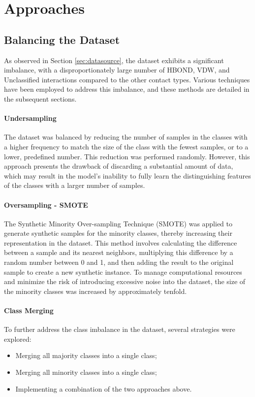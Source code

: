 \documentclass[10pt,twocolumn,letterpaper]{article}
\begin{document}
\section{Approaches}
\subsection{Balancing the Dataset}
As observed in Section \ref{sec:datasource}, the dataset exhibits a significant imbalance, with a disproportionately large number of HBOND, VDW, and Unclassified interactions compared to the other contact types. 
Various techniques have been employed to address this imbalance, and these methods are detailed in the subsequent sections.
\paragraph{Undersampling}
The dataset was balanced by reducing the number of samples in the classes with a higher frequency to match the size of the class with the fewest samples, or to a lower, predefined number. 
This reduction was performed randomly. However, this approach presents the drawback of discarding a substantial amount of data, which may result in the model's inability to fully learn the distinguishing features of the classes with a larger number of samples.

\paragraph{Oversampling - SMOTE}
The Synthetic Minority Over-sampling Technique (SMOTE)\cite{chawla2002smote} was applied to generate synthetic samples for the minority classes, thereby increasing their representation in the dataset. 
This method involves calculating the difference between a sample and its nearest neighbors, multiplying this difference by a random number between 0 and 1, and then adding the result to the original sample to create a new synthetic instance. 
To manage computational resources and minimize the risk of introducing excessive noise into the dataset, the size of the minority classes was increased by approximately tenfold.

\paragraph{Class Merging}
To further address the class imbalance in the dataset, several strategies were explored:
\begin{itemize}
    \item Merging all majority classes into a single class;
    \item Merging all minority classes into a single class;
    \item Implementing a combination of the two approaches above.
\end{itemize}
\end{document}
